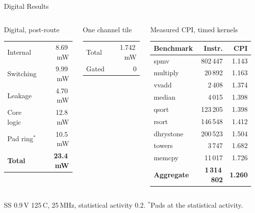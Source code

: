 \documentclass[10pt, aspectratio=169]{beamer}
\begin{document}
\begin{frame}{Digital Results}
\begin{columns}[T]
\begin{block}{Digital, post-route}
\footnotesize
\begin{tabular}{@{}lr@{}}
\toprule
Internal   & 8.69\,mW \\
Switching  & 9.99\,mW \\
Leakage    & 4.70\,mW \\
\midrule
Core logic & 12.8\,mW \\
Pad ring$^{*}$ & 10.5\,mW \\
\textbf{Total} & \textbf{23.4\,mW} \\
\bottomrule
\end{tabular}
\end{block}
\begin{block}{One channel tile}
\footnotesize
\begin{tabular}{@{}lr@{}}
\toprule
Total      & 1.742\,mW \\
Gated      & 0 \\
\bottomrule
\end{tabular}
\end{block}
\begin{block}{Measured CPI, timed kernels}
\scriptsize
\begin{tabular}{@{}lrr@{}}
\toprule
Benchmark & Instr. & CPI \\
\midrule
spmv      & 802\,447 & 1.143 \\
multiply  &  20\,892 & 1.163 \\
vvadd     &   2\,408 & 1.374 \\
median    &   4\,015 & 1.398 \\
qsort     & 123\,205 & 1.398 \\
rsort     & 146\,548 & 1.412 \\
dhrystone & 200\,523 & 1.504 \\
towers    &   3\,747 & 1.682 \\
memcpy    &  11\,017 & 1.726 \\
\midrule
\textbf{Aggregate} & \textbf{1\,314\,802} & \textbf{1.260} \\
\bottomrule
\end{tabular}
\end{block}
\end{columns}
\vspace{0.1cm}
{\centering\footnotesize SS 0.9\,V 125\,\textdegree C, 25\,MHz, statistical activity 0.2. $^{*}$Pads at the statistical activity.\par}
\end{frame}
\end{document}
